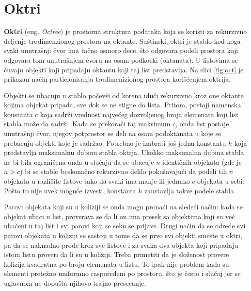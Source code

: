 \documentclass[12pt,oneside]{memoir}
\begin{document}
\section{Oktri}
\label{subsec:octree}

\textbf{Oktri} (eng. {\em Octree}) je prostorna struktura podataka koja se koristi za rekurzivno deljenje trodimenzionog prostora na oktante.
Suštinski, oktri je stablo kod koga svaki unutrašnji čvor ima tačno osmoro dece,
što odgovara podeli prostora koji odgovara tom unutrašnjem čvoru na osam podkocki (oktanata).
U listovima se čuvaju objekti koji pripadaju oktantu koji taj list predstavlja.
Na slici \ref{fig:oct} je prikazan način particionisanja trodimenizionog prostora korišćenjem oktrija.

Objekti se ubacuju u stablo počevši od korena idući rekurzivno kroz one oktante kojima objekat pripada,
sve dok se ne stigne do lista.
Pritom, postoji namenska konstanta $c$ koja sadrži vrednost najvećeg dozvoljenog broja elemenata koji list stabla može da sadrži.
Kada se prekorači taj maksimum $c$, onda list postaje unutrašnji čvor, njegov potprostor se deli 
na osam podoktanata u koje se prebacuju objekti koje je sadržao.
Potrebno je izabrati još jednu konstantu $h$ koja predstavlja maksimalnu dubinu stabla oktrja.
Ukoliko maksimalna dubina stabla ne bi bila ograničena onda u slučaju da se ubacuje $n$ identičnih objekata (gde je $n > c$) bi se stablo 
beskonačno rekurzivno delilo pokušavajući da podeli tih $n$ objekata u različite listove 
tako da svaki ima manje ili jednako $c$ objekata u sebi. 
Pošto to nije uvek moguće izvesti, konstanta $h$ zaustavlja takve podele stabla.

Parovi objekata koji su u koliziji se onda mogu pronaći na sledeći način:
kada se objekat ubaci u list, proverava se da li on ima presek sa objektima koji su već
ubačeni u taj list i svi parovi koji se seku se prijave.
Drugi način da se odrede svi parovi objekata u koliziji se sastoji u tome da se prvo svi objekti smeste u oktri, 
pa da se naknadno prođe kroz sve listove i za svaka dva objekta koji pripadaju istom listu proveri da li su u koliziji.
Treba primetiti da je složenost provere kolizija kvadratna po broju elemenata u listu.
To ipak nije problem kada su elementi pretežno uniformno raspoređeni po prostoru, što je često 
i slučaj jer se uglavnom ne dopušta njihovo trajno presecanje. 
\end{document}
